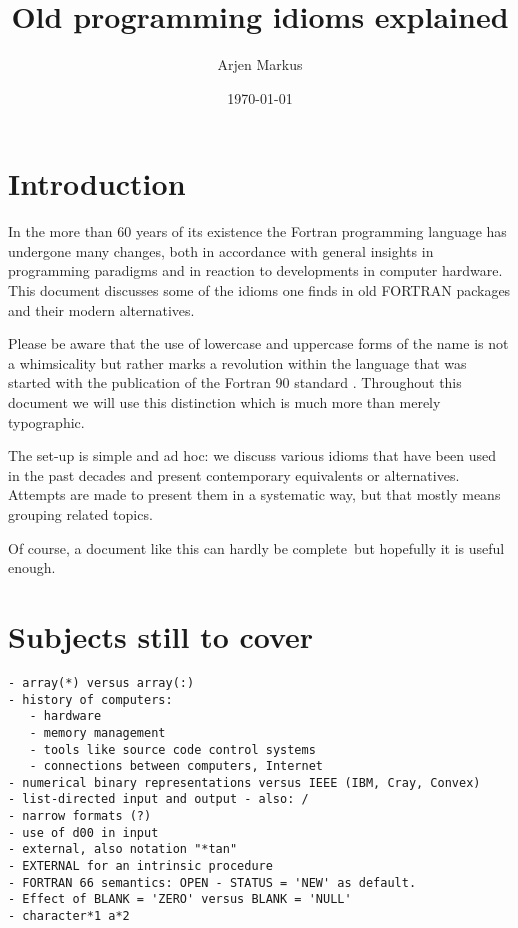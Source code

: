 \documentclass{article}
\date{\today}
\author{Arjen Markus}
\title{Old programming idioms explained}
\begin{document}
\maketitle

\tableofcontents
\newpage

\section{Introduction}
In the more than 60 years of its existence the Fortran programming
language has undergone many changes, both in accordance with general insights
in programming paradigms and in reaction to developments in computer hardware.
This document discusses some of the idioms one finds in old FORTRAN packages
and their modern alternatives.

Please be aware that the use of lowercase and uppercase forms of the name is
not a whimsicality but rather marks a revolution within the language that was
started with the publication of the Fortran 90 standard \cite{Fortran90Standard}. Throughout
this document we will use this distinction which is much more than merely
typographic.

The set-up is simple and ad hoc: we discuss various idioms that have been
used in the past decades and present contemporary equivalents or alternatives.
Attempts are made to present them in a systematic way, but that mostly means grouping
related topics.

Of course, a document like this can hardly be complete\, but hopefully it is
useful enough.












\section{Subjects still to cover}
\begin{verbatim}
- array(*) versus array(:)
- history of computers:
   - hardware
   - memory management
   - tools like source code control systems
   - connections between computers, Internet
- numerical binary representations versus IEEE (IBM, Cray, Convex)
- list-directed input and output - also: /
- narrow formats (?)
- use of d00 in input
- external, also notation "*tan"
- EXTERNAL for an intrinsic procedure
- FORTRAN 66 semantics: OPEN - STATUS = 'NEW' as default.
- Effect of BLANK = 'ZERO' versus BLANK = 'NULL'
- character*1 a*2
\end{verbatim}
\end{document}
